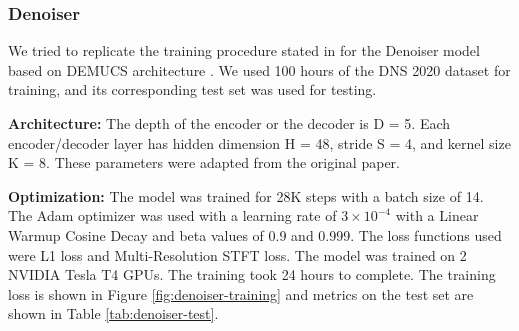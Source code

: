 \subsubsection{Denoiser}
We tried to replicate the training procedure stated in \cite{defossez2020} for the Denoiser model based on DEMUCS architecture \cite{demucs}. We used 100 hours of the DNS 2020 dataset \cite{reddy2020} for training, and its corresponding test set was used for testing.

\textbf{Architecture:} The depth of the encoder or the decoder is D = 5. Each encoder/decoder layer has hidden dimension H = 48, stride S = 4, and kernel size K = 8. These parameters were adapted from the original paper.

\textbf{Optimization:} The model was trained for 28K steps with a batch size of 14. The Adam \cite{kingma2017adam} optimizer was used with a learning rate of $3\times 10^{-4}$ with a Linear Warmup Cosine Decay and beta values of 0.9 and 0.999. The loss functions used were L1 loss and Multi-Resolution STFT loss.
The model was trained on 2 NVIDIA Tesla T4 GPUs. The training took 24 hours to complete. The training loss is shown in Figure \ref{fig:denoiser-training} and metrics on the test set are shown in Table \ref{tab:denoiser-test}.

